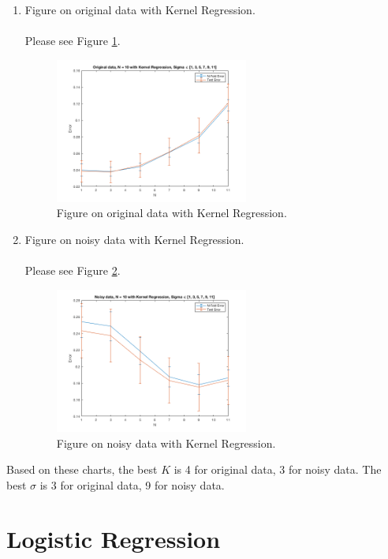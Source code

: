 \documentclass[english]{article}
\begin{document}
\begin{enumerate}[label=(\roman*)]
\begin{enumerate}
        \item Figure on original data with Kernel Regression.\\ \\
        Please see Figure \ref{fig:223}. \\
        \begin{figure}[H]
          \centering
          \includegraphics[width=0.6\textwidth]{223.png}
          \caption{Figure on original data with Kernel Regression.}
          \label{fig:223}
        \end{figure}
        \item Figure on noisy data with Kernel Regression.\\ \\
        Please see Figure \ref{fig:224}. \\
        \begin{figure}[H]
          \centering
          \includegraphics[width=0.6\textwidth]{224.png}
          \caption{Figure on noisy data with Kernel Regression.}
          \label{fig:224}
        \end{figure}
    \end{enumerate}
    Based on these charts, the best $K$ is 4 for original data, 3 for noisy data. The best $\sigma$ is 3 for original data, 9 for noisy data.\\

    \section{Logistic Regression}


\end{enumerate}
\end{document}
